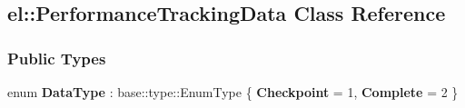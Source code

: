 \hypertarget{a00067}{}\subsection{el\+:\+:Performance\+Tracking\+Data Class Reference}
\label{a00067}
\subsubsection*{Public Types}
\begin{DoxyCompactItemize}
\item 
\hypertarget{a00067_a1b45d5b1d5e76d0687aaffcf08302f17}{}enum {\bfseries Data\+Type} \+: base\+::type\+::\+Enum\+Type \{ {\bfseries Checkpoint} = 1, 
{\bfseries Complete} = 2
 \}\label{a00067_a1b45d5b1d5e76d0687aaffcf08302f17}

\end{DoxyCompactItemize}
